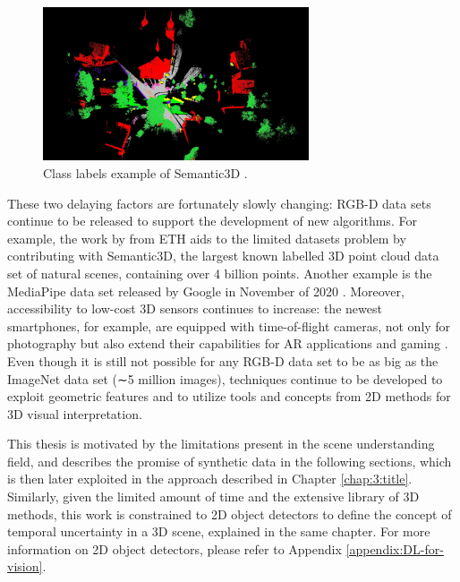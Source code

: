 \begin{figure}[!ht]
        \centering
        \includegraphics[width=0.7\textwidth]{images/sceneU02-hackel.png}
        \caption{Class labels example of Semantic3D \cite{hackel2017semantic3d}.
        }
        \label{fig:3Dsegsem-hackel}
\end{figure}


These two delaying factors are fortunately slowly changing: RGB-D data sets continue to be released to support the development of new algorithms. For example, the work by \textcite{hackel2017semantic3d} from ETH aids to the limited datasets problem by contributing with Semantic3D, the largest known labelled 3D point cloud data set of natural scenes, containing over 4 billion points. Another example is the MediaPipe data set released by Google in November of 2020 \cite{objectron2021dataset}. Moreover, accessibility to low-cost 3D sensors continues to increase: the newest smartphones, for example, are equipped with time-of-flight cameras, not only for photography but also extend their capabilities for AR applications and gaming \cite{tian2019occlusion}. Even though it is still not possible for any RGB-D data set to be as big as the ImageNet data set (∼5 million images), techniques continue to be developed to exploit geometric features and to utilize tools and concepts from 2D methods for 3D visual interpretation.

This thesis is motivated by the limitations present in the scene understanding field, and describes the promise of synthetic data in the following sections, which is then later exploited in the approach described in Chapter \ref{chap:3:title}. Similarly, given the limited amount of time and the extensive library of 3D methods, this work is constrained to 2D object detectors to define the concept of temporal uncertainty in a 3D scene, explained in the same chapter.
For more information on 2D object detectors, please refer to Appendix \ref{appendix:DL-for-vision}.


